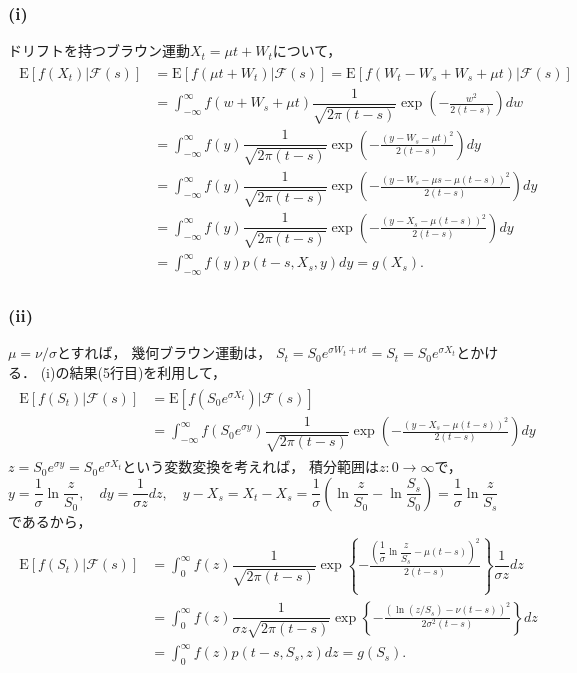 \documentclass[a4paper,11pt]{jsarticle}
\newcommand{\df}[2]{\dfrac{#1}{#2}}
\newcommand{\intinf}{\int_{-\infty}^{\infty}}
\newcommand{\intzero}{\int_{0}^{\infty}}
\newcommand{\E}{\mathrm{E}}
\newcommand{\F}{\mathcal{F}}
\newcommand{\1}{\mbox{1}\hspace{-0.30em}\mbox{1}}
\begin{document}
\subsubsection{(i)}
ドリフトを持つブラウン運動$X_t=\mu t+W_t$について，
\begin{align*}
  \begin{split}
    \E[f(X_t)|\F(s)]&=\E[f(\mu t+W_t)|\F(s)]
    =\E[f(W_t-W_s+W_s+\mu t)|\F(s)] \\
    &=\intinf f(w+W_s+\mu t)\df{1}{\sqrt{2\pi(t-s)}}
    \exp\left(-\frac{w^2}{2(t-s)}\right)dw \\
    &=\intinf f(y)\df{1}{\sqrt{2\pi(t-s)}}
    \exp\left(-\frac{(y-W_s-\mu t)^2}{2(t-s)}\right)dy\\
    &=\intinf f(y)\df{1}{\sqrt{2\pi(t-s)}}
    \exp\left(-\frac{(y-W_s-\mu s-\mu(t-s))^2}{2(t-s)}\right)dy\\
    &=\intinf f(y)\df{1}{\sqrt{2\pi(t-s)}}
    \exp\left(-\frac{(y-X_s-\mu(t-s))^2}{2(t-s)}\right)dy\\
    &=\intinf f(y)p(t-s,X_s,y)dy=g(X_s).
  \end{split}
\end{align*}

\subsubsection{(ii)}
$\mu=\nu/\sigma$とすれば，
幾何ブラウン運動は，
$S_t=S_0 e^{\sigma W_t+\nu t}=S_t=S_0 e^{\sigma X_t}$とかける．
(i)の結果(5行目)を利用して，
\begin{align*}
  \begin{split}
    \E[f(S_t)|\F(s)]&=\E[f(S_0 e^{\sigma X_t})|\F(s)] \\
    &=\intinf f(S_0 e^{\sigma y})\df{1}{\sqrt{2\pi(t-s)}}
    \exp\left(-\frac{(y-X_s-\mu(t-s))^2}{2(t-s)}\right)dy
  \end{split}
\end{align*}
$z=S_0 e^{\sigma y}=S_0 e^{\sigma X_t}$という変数変換を考えれば，
積分範囲は$z:0\to\infty$で，\\
$y=\df{1}{\sigma}\ln{\df{z}{S_0}}, \quad dy=\df{1}{\sigma z}dz, \quad
y-X_s=X_t-X_s=\df{1}{\sigma}(\ln{\df{z}{S_0}}-\ln{\df{S_s}{S_0}})
=\df{1}{\sigma}\ln{\df{z}{S_s}}$であるから，
\begin{align*}
  \begin{split}
    \E[f(S_t)|\F(s)]
    &=\intzero f(z)\df{1}{\sqrt{2\pi(t-s)}}
    \exp\left\{-\frac{\left( \df{1}{\sigma}\ln\df{z}{S_s}
    -\mu(t-s) \right)^2}{2(t-s)}\right\}\df{1}{\sigma z}dz \\
    &=\intzero f(z)\df{1}{\sigma z\sqrt{2\pi(t-s)}}
    \exp\left\{-\frac{\left(\ln(z/S_s)-\nu(t-s)\right)^2}
    {2\sigma^2(t-s)}\right\}dz \\
    &=\intzero f(z) p(t-s,S_s,z)dz=g(S_s).
  \end{split}
\end{align*}
\end{document}

